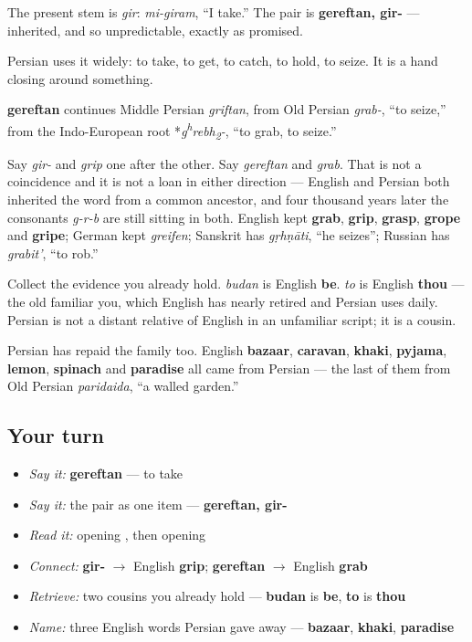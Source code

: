 The present stem is \emph{gir}: \emph{mi-giram}, “I take.” The pair is \textbf{gereftan, gir-} — inherited, and so unpredictable, exactly as promised.

Persian uses it widely: to take, to get, to catch, to hold, to seize. It is a hand closing around something.

\begin{cousinweb}
\textbf{gereftan} continues Middle Persian \emph{griftan}, from Old Persian \emph{grab-}, “to seize,” from the Indo-European root *\emph{g\textsuperscript{h}rebh\textsubscript{2}-}, “to grab, to seize.”

Say \emph{gir-} and \emph{grip} one after the other. Say \emph{gereftan} and \emph{grab}. That is not a coincidence and it is not a loan in either direction — English and Persian both inherited the word from a common ancestor, and four thousand years later the consonants \emph{g-r-b} are still sitting in both. English kept \textbf{grab}, \textbf{grip}, \textbf{grasp}, \textbf{grope} and \textbf{gripe}; German kept \emph{greifen}; Sanskrit has \emph{gṛhṇāti}, “he seizes”; Russian has \emph{grabit'}, “to rob.”

Collect the evidence you already hold. \emph{budan} is English \textbf{be}. \emph{to} is English \textbf{thou} — the old familiar you, which English has nearly retired and Persian uses daily. Persian is not a distant relative of English in an unfamiliar script; it is a cousin.

Persian has repaid the family too. English \textbf{bazaar}, \textbf{caravan}, \textbf{khaki}, \textbf{pyjama}, \textbf{lemon}, \textbf{spinach} and \textbf{paradise} all came from Persian — the last of them from Old Persian \emph{paridaida}, “a walled garden.”
\end{cousinweb}

\subsection*{Your turn}
\begin{itemize}
\raggedright
  \item \emph{Say it:} \textbf{gereftan} — to take
  \item \emph{Say it:} the pair as one item — \textbf{gereftan, gir-}
  \item \emph{Read it:} \textbf{} opening \textbf{}, then \textbf{} opening \textbf{}
  \item \emph{Connect:} \textbf{gir-} $\to$ English \textbf{grip}; \textbf{gereftan} $\to$ English \textbf{grab}
  \item \emph{Retrieve:} two cousins you already hold — \textbf{budan} is \textbf{be}, \textbf{to} is \textbf{thou}
  \item \emph{Name:} three English words Persian gave away — \textbf{bazaar}, \textbf{khaki}, \textbf{paradise}
\end{itemize}

